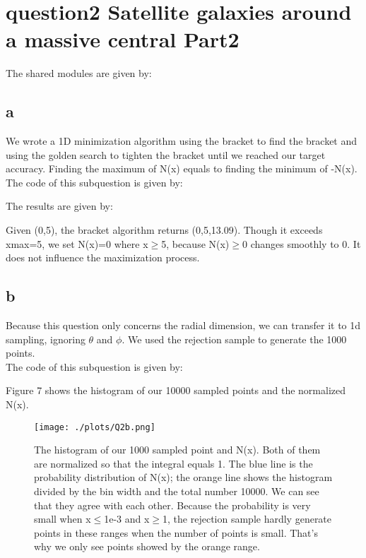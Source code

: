 \section{question2 Satellite galaxies around a massive central Part2}

The shared modules are given by:



\subsection{a}
We wrote a 1D minimization algorithm using the bracket to find the bracket and using the golden search to tighten the bracket until we reached our target accuracy. Finding the maximum of N(x) equals to finding the minimum of -N(x).\\

The code of this subquestion is given by:


The results are given by:

Given (0,5), the bracket algorithm returns (0,5,13.09). Though it exceeds xmax=5, we set N(x)=0 where x$\geq$5, because N(x)$\geq$0 changes smoothly to 0. It does not influence the maximization process.

\subsection{b}
Because this question only concerns the radial dimension, we can transfer it to 1d sampling, ignoring $\theta$ and $\phi$. We used the rejection sample to generate the 1000 points.\\
The code of this subquestion is given by:


Figure 7 shows the histogram of our 10000 sampled points and the normalized N(x).\\

\begin{figure}[h!]
  \centering
  \texttt{[image: ./plots/Q2b.png]}
  \caption{The histogram of our 1000 sampled point and N(x). Both of them are normalized so that the integral equals 1. The blue line is the probability distribution of N(x); the orange line shows the histogram divided by the bin width and the total number 10000. We can see that they agree with each other. Because the probability is very small when x$\leq$1e-3 and x$\geq$1, the rejection sample hardly generate points in these ranges when the number of points is small. That's why we only see points showed by the orange range.}
  \label{fig7}
\end{figure}


